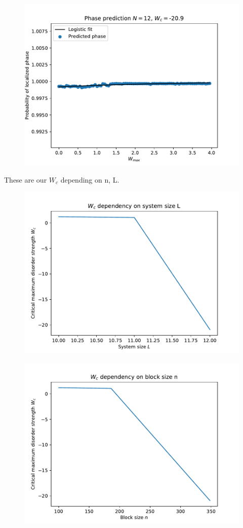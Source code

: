 \documentclass[reprint,amsmath,amssymb,aps,prb]{revtex4-2}
\begin{document}
\begin{figure}[h!]
	\centering
	\includegraphics[width=0.7\linewidth]{../results/N12_predict_wc}
	\caption{}
	\label{fig:N12_predict_wc}
\end{figure}


These are our $W_c$ depending on n, L.


\begin{figure}
	\centering
	\includegraphics[width=0.7\linewidth]{../results/Wc_L_dependency}
	\caption{}
	\label{fig:Wc_L_dependency}
\end{figure}
\begin{figure}
\centering
\includegraphics[width=0.7\linewidth]{../results/Wc_N_dependency}
\caption{}
\label{fig:Wc_N_dependency}
\end{figure}
\end{document}
